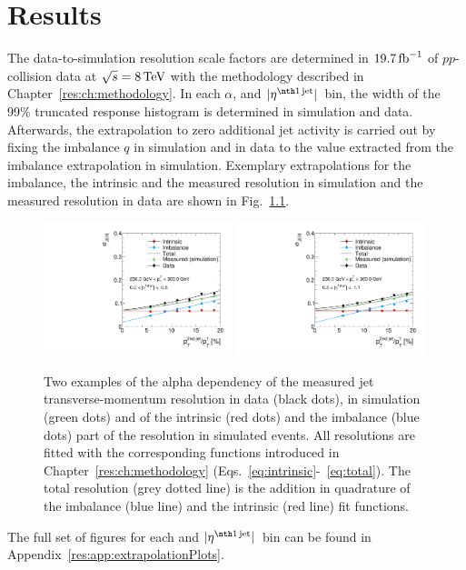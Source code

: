 \chapter{Results}
\label{res:ch:results}
The data-to-simulation resolution scale factors \rhores are determined in $19.7\,\text{fb}^{-1}$ of $pp$-collision data at $\sqrt{s} = 8 \,\text{Te}\kern-0.06667em\text{V}$ with the methodology described in Chapter~\ref{res:ch:methodology}.
In each $\alpha$, \ptgamma and $|\etafirstjet|$~bin, the width of the 99\% truncated response histogram is determined in simulation and data.
Afterwards, the extrapolation to zero additional jet activity is carried out by fixing the imbalance $q$ in simulation and in data to the value extracted from the imbalance extrapolation in simulation.
Exemplary extrapolations for the imbalance, the intrinsic and the measured resolution in simulation and the measured resolution in data are shown in Fig.~\ref{res:fig:ExtrapolationsWithData}.
\begin{figure}[!t]
 \centering
    \includegraphics[width=0.49\textwidth]{figures/resolution/results/JER_for_1_eta_bin_10_pTGamma_bin_all_contributions_PFCHS_RMS99_mc.pdf}
    \includegraphics[width=0.49\textwidth]{figures/resolution/results/JER_for_2_eta_bin_10_pTGamma_bin_all_contributions_PFCHS_RMS99_mc.pdf}
  \caption{Two examples of the alpha dependency of the measured jet transverse-momentum resolution in data (black dots), in simulation (green dots) and  of the intrinsic (red dots) and the imbalance (blue dots) part 
           of the resolution in simulated events. All resolutions are fitted with the corresponding functions introduced in Chapter~\ref{res:ch:methodology} (Eqs.~\eqref{eq:intrinsic}-~\eqref{eq:total}).
           The total resolution (grey dotted line) is the addition in quadrature of the imbalance (blue line) and the intrinsic (red line) fit functions. }
  \label{res:fig:ExtrapolationsWithData}
\end{figure}
The full set of figures for each \ptgamma and $|\etafirstjet|$~bin can be found in Appendix~\ref{res:app:extrapolationPlots}.

